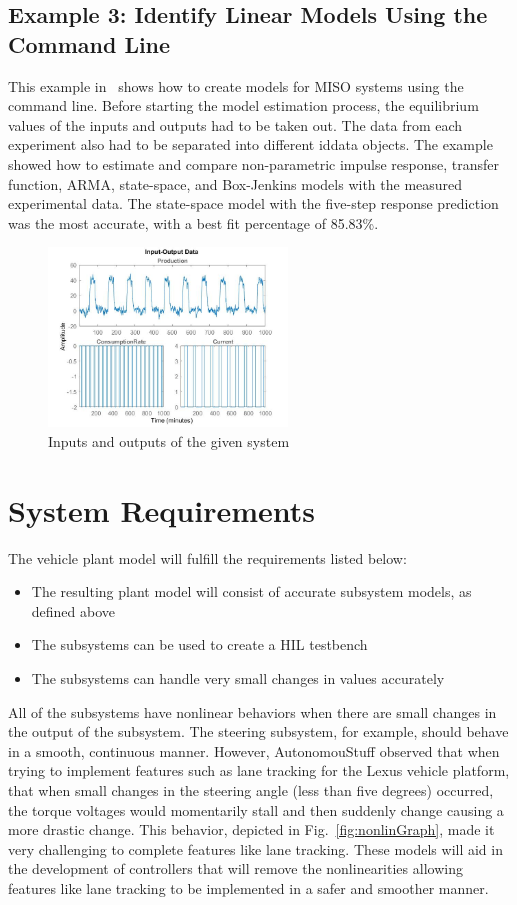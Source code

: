 \documentclass[journal,twoside,web]{ieeecolor}
\begin{document}
\subsection{Example 3: Identify Linear Models Using the Command Line}
\label{sec:sysID-Example3}
This example in~\cite{example3} shows how to create models for MISO systems
using the command line. Before starting the model estimation process, the
equilibrium values of the inputs and outputs had to be taken out. The data from
each experiment also had to be separated into different iddata objects. The
example showed how to estimate and compare non-parametric impulse response,
transfer function, ARMA, state-space, and Box-Jenkins models with the measured
experimental data. The state-space model with the five-step response prediction
was the most accurate, with a best fit percentage of 85.83\%.
\begin{figure}[htbp]
    \centering
    \includegraphics[width=2.5in]{figs/img/commandLineIO}
    \caption{Inputs and outputs of the given system}
    \label{fig:exIO}
\end{figure}


\section{System Requirements}
The vehicle plant model will fulfill the requirements listed below:
\begin{itemize}
    \item The resulting plant model will consist of accurate subsystem models, as defined above
    \item The subsystems can be used to create a HIL testbench
    \item The subsystems can handle very small changes in values accurately
\end{itemize}

All of the subsystems have nonlinear behaviors when there are small changes in the output of the subsystem. The steering subsystem, for example, should behave in a smooth, continuous manner. However, AutonomouStuff observed that when trying to implement features such as lane tracking for the Lexus vehicle platform, that when small changes in the steering angle (less than five degrees) occurred, the torque voltages would momentarily stall and then suddenly change causing a more drastic change. This behavior, depicted in Fig.~\ref{fig:nonlinGraph}, made it very challenging to complete features like lane tracking. These models will aid in the development of controllers that will remove the nonlinearities allowing features like lane tracking to be implemented in a safer and smoother manner. 
\end{document}
